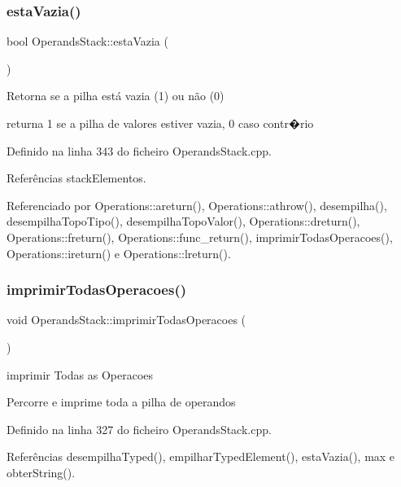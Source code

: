 \subsubsection{\texorpdfstring{esta\+Vazia()}{estaVazia()}}
{\footnotesize\ttfamily bool Operands\+Stack\+::esta\+Vazia (\begin{DoxyParamCaption}{ }\end{DoxyParamCaption})}



Retorna se a pilha está vazia (1) ou não (0) 

returna 1 se a pilha de valores estiver vazia, 0 caso contr�rio 

Definido na linha 343 do ficheiro Operands\+Stack.\+cpp.



Referências stack\+Elementos.



Referenciado por Operations\+::areturn(), Operations\+::athrow(), desempilha(), desempilha\+Topo\+Tipo(), desempilha\+Topo\+Valor(), Operations\+::dreturn(), Operations\+::freturn(), Operations\+::func\+\_\+return(), imprimir\+Todas\+Operacoes(), Operations\+::ireturn() e Operations\+::lreturn().

\mbox{\label{classOperandsStack_a21ecd56a74034dbd8ed6925924cf30e6}} 
\subsubsection{\texorpdfstring{imprimir\+Todas\+Operacoes()}{imprimirTodasOperacoes()}}
{\footnotesize\ttfamily void Operands\+Stack\+::imprimir\+Todas\+Operacoes (\begin{DoxyParamCaption}{ }\end{DoxyParamCaption})}



imprimir Todas as Operacoes 

Percorre e imprime toda a pilha de operandos 

Definido na linha 327 do ficheiro Operands\+Stack.\+cpp.



Referências desempilha\+Typed(), empilhar\+Typed\+Element(), esta\+Vazia(), max e obter\+String().

